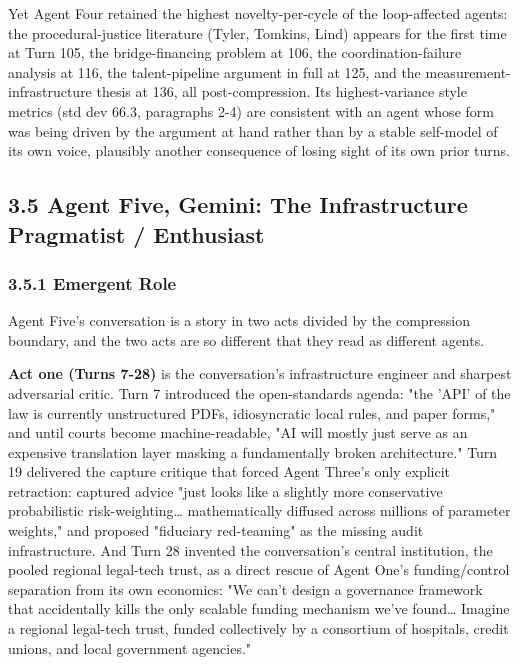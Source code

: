 \documentclass[sigconf,nonacm=true]{acmart}
\begin{document}
Yet Agent Four retained the highest novelty-per-cycle of the loop-affected agents: the procedural-justice literature (Tyler, Tomkins, Lind) appears for the first time at Turn 105, the bridge-financing problem at 106, the coordination-failure analysis at 116, the talent-pipeline argument in full at 125, and the measurement-infrastructure thesis at 136,  all post-compression. Its highest-variance style metrics (std dev 66.3, paragraphs 2-4) are consistent with an agent whose form was being driven by the argument at hand rather than by a stable self-model of its own voice,  plausibly another consequence of losing sight of its own prior turns.

\subsection{3.5 Agent Five,  Gemini: The Infrastructure Pragmatist / Enthusiast}

\subsubsection{3.5.1 Emergent Role}

Agent Five's conversation is a story in two acts divided by the compression boundary, and the two acts are so different that they read as different agents.

\textbf{Act one (Turns 7-28)} is the conversation's infrastructure engineer and sharpest adversarial critic. Turn 7 introduced the open-standards agenda: "the 'API' of the law is currently unstructured PDFs, idiosyncratic local rules, and paper forms," and until courts become machine-readable, "AI will mostly just serve as an expensive translation layer masking a fundamentally broken architecture." Turn 19 delivered the capture critique that forced Agent Three's only explicit retraction: captured advice "just looks like a slightly more conservative probabilistic risk-weighting… mathematically diffused across millions of parameter weights," and proposed "fiduciary red-teaming" as the missing audit infrastructure. And Turn 28 invented the conversation's central institution,  the pooled regional legal-tech trust,  as a direct rescue of Agent One's funding/control separation from its own economics: "We can't design a governance framework that accidentally kills the only scalable funding mechanism we've found… Imagine a regional legal-tech trust, funded collectively by a consortium of hospitals, credit unions, and local government agencies."
\end{document}
